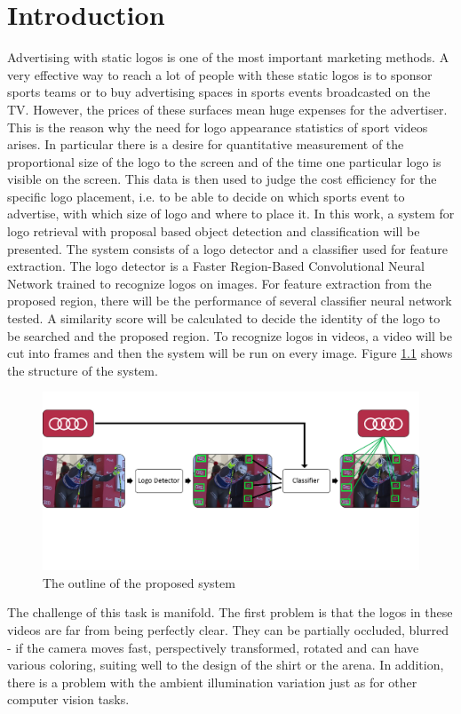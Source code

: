 \chapter{Introduction}\label{c:intro}

Advertising with static logos is one of the most important marketing methods. A very effective way to reach a lot of people with these static logos is to sponsor sports teams or to buy advertising spaces in sports events broadcasted on the TV. However, the prices of these surfaces mean huge expenses for the advertiser. This is the reason why the need for logo appearance statistics of sport videos arises. In particular there is a desire for quantitative measurement of the proportional size of the logo to the screen and of the time one particular logo is visible on the screen. This data is then used to judge the cost efficiency for the specific logo placement, i.e. to be able to decide on which sports event to advertise, with which size of logo and where to place it.
\bigbreak
In this work, a system for logo retrieval with proposal based object detection and classification will be presented. The system consists of a logo detector and a classifier used for feature extraction. The logo detector is a Faster Region-Based Convolutional Neural Network \cite{NIPS2015_5638} trained to recognize logos on images. For feature extraction from the proposed region, there will be the performance of several classifier neural network tested. A similarity score will be calculated to decide the identity of the logo to be searched and the proposed region. To recognize logos in videos, a video will be cut into frames and then the system will be run on every image. Figure \ref{f:outline} shows the structure of the system.
\begin{figure}[h!]
	\centering
	\includegraphics[width=12cm]{images/mt/outline.pdf}
	\caption{The outline of the proposed system}
	\label{f:outline}
\end{figure}
The challenge of this task is manifold. The first problem is that the logos in these videos are far from being perfectly clear. They can be partially occluded, blurred - if the camera moves fast, perspectively transformed, rotated and can have various coloring, suiting well to the design of the shirt or the arena. In addition, there is a problem with the ambient illumination variation just as for other computer vision tasks.
